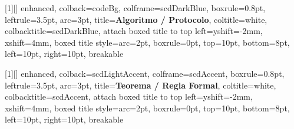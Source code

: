 [1][]{
  enhanced,
  colback=codeBg,
  colframe=scdDarkBlue,
  boxrule=0.8pt,
  leftrule=3.5pt,
  arc=3pt,
  title=\textbf{\textsf{Algoritmo / Protocolo}},
  coltitle=white,
  colbacktitle=scdDarkBlue,
  attach boxed title to top left={yshift=-2mm, xshift=4mm},
  boxed title style={arc=2pt, boxrule=0pt},
  top=10pt,
  bottom=8pt,
  left=10pt,
  right=10pt,
  breakable
}

[1][]{
  enhanced,
  colback=scdLightAccent,
  colframe=scdAccent,
  boxrule=0.8pt,
  leftrule=3.5pt,
  arc=3pt,
  title=\textbf{\textsf{Teorema / Regla Formal}},
  coltitle=white,
  colbacktitle=scdAccent,
  attach boxed title to top left={yshift=-2mm, xshift=4mm},
  boxed title style={arc=2pt, boxrule=0pt},
  top=10pt,
  bottom=8pt,
  left=10pt,
  right=10pt,
  breakable
}

